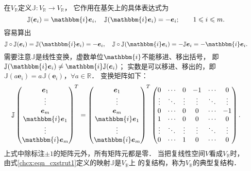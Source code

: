 在$V_{\mathbb{R}}$定义$\mathbb{J}:V_{\mathbb{R}}\to V_{\mathbb{R}}$，
它作用在基矢上的具体表达式为
\begin{equation}\label{chcx:eqn_cxstrut1}
    \mathbb{J} (\boldsymbol{e}_i) = \mathbbm{i} \boldsymbol{e}_i, \quad
    \mathbb{J} (\mathbbm{i}\boldsymbol{e}_i) = - \boldsymbol{e}_i; \qquad 1\leqslant i \leqslant m.
\end{equation}
容易算出
\begin{equation}
    \mathbb{J}\circ \mathbb{J} (\boldsymbol{e}_i) = \mathbb{J} (\mathbbm{i}\boldsymbol{e}_i) = - \boldsymbol{e}_i, \quad
    \mathbb{J}\circ \mathbb{J} (\mathbbm{i}\boldsymbol{e}_i) = - \mathbb{J} \boldsymbol{e}_i = -\mathbbm{i}\boldsymbol{e}_i.
\end{equation}
需要注意$\mathbb{J}$是线性变换，虚数单位$\mathbbm{i}$不能移进、移出括号，
即$\mathbb{J} (\mathbbm{i}\boldsymbol{e}_i)\neq \mathbbm{i}\mathbb{J} (\boldsymbol{e}_i)$；
实数是可以移进、移出的，即$\mathbb{J} (a\boldsymbol{e}_i)=a \mathbb{J} (\boldsymbol{e}_i)$，$\forall a\in \mathbb{R}$．
变换矩阵如下：
\begin{equation}\label{chcx:eqn_J-matrix}
    \mathbb{J} \begin{pmatrix}
        \boldsymbol{e}_1 \\  \vdots\\ \boldsymbol{e}_m \\   
        \mathbbm{i}\boldsymbol{e}_1\\  \vdots\\ \mathbbm{i}\boldsymbol{e}_m
    \end{pmatrix}^T
    =\begin{pmatrix}
        \boldsymbol{e}_1 \\  \vdots\\ \boldsymbol{e}_m \\   
        \mathbbm{i}\boldsymbol{e}_1\\  \vdots\\ \mathbbm{i}\boldsymbol{e}_m
    \end{pmatrix}^T
    \begin{pmatrix}
        0&\cdots&0 & -1 &  \cdots & 0\\
        \vdots&\ddots&\vdots &\vdots&\ddots&\vdots\\
        0&\cdots&0 & 0 &  \cdots & -1\\
        1&\cdots&0 &0&\cdots&0 \\
        \vdots&\ddots&\vdots &\vdots&\ddots&\vdots\\
        0&\cdots&1 & 0 & \cdots & 0
    \end{pmatrix} .
\end{equation}
上式中除标注$\pm 1$的矩阵元外，所有矩阵元都是零．
当把复线性空间$V$看成$V_{\mathbb{R}}$时，
由式\eqref{chcx:eqn_cxstrut1}定义的映射$\mathbb{J}$是$V_{\mathbb{R}}$上
的{\kaishu 复结构}，称为$V_{\mathbb{R}}$的{\heiti 典型复结构}．


